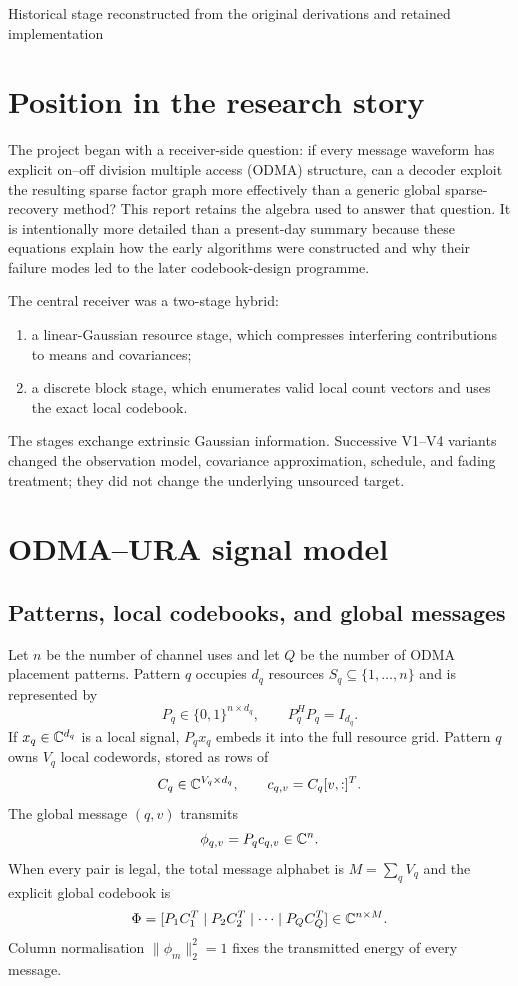 \documentclass[11pt]{article}
\begin{document}
{Historical stage reconstructed from the original derivations and retained implementation}

\section{Position in the research story}

The project began with a receiver-side question: if every message waveform has explicit on--off division multiple
access (ODMA) structure, can a decoder exploit the resulting sparse factor graph more effectively than a generic
global sparse-recovery method? This report retains the algebra used to answer that question. It is intentionally more
detailed than a present-day summary because these equations explain how the early algorithms were constructed and why
their failure modes led to the later codebook-design programme.

The central receiver was a two-stage hybrid:
\begin{enumerate}
 \item a linear-Gaussian resource stage, which compresses interfering contributions to means and covariances;
 \item a discrete block stage, which enumerates valid local count vectors and uses the exact local codebook.
\end{enumerate}
The stages exchange extrinsic Gaussian information. Successive V1--V4 variants changed the observation model,
covariance approximation, schedule, and fading treatment; they did not change the underlying unsourced target.


\section{ODMA--URA signal model}

\subsection{Patterns, local codebooks, and global messages}

Let $n$ be the number of channel uses and let $Q$ be the number of ODMA placement patterns. Pattern $q$ occupies
$d_q$ resources $S_q\subseteq\{1,\ldots,n\}$ and is represented by
\[
 P_q\in\{0,1\}^{n\times d_q},\qquad P_q^HP_q=I_{d_q}.
\]
If $x_q\in\mathbb{C}^{d_q}$ is a local signal, $P_qx_q$ embeds it into the full resource grid. Pattern $q$ owns $V_q$ local
codewords, stored as rows of
\[
 C_q\in\mathbb{C}^{V_q\times d_q},\qquad c_{q,v}=C_q[v,:]^T.
\]
The global message $(q,v)$ transmits
\[
 \phi_{q,v}=P_qc_{q,v}\in\mathbb{C}^n.
\]
When every pair is legal, the total message alphabet is $M=\sum_qV_q$ and the explicit global codebook is
\[
 \Phi=[P_1C_1^T\mid P_2C_2^T\mid\cdots\mid P_QC_Q^T]\in\mathbb{C}^{n\times M}.
\]
Column normalisation $\|\phi_m\|_2^2=1$ fixes the transmitted energy of every message.
\end{document}
